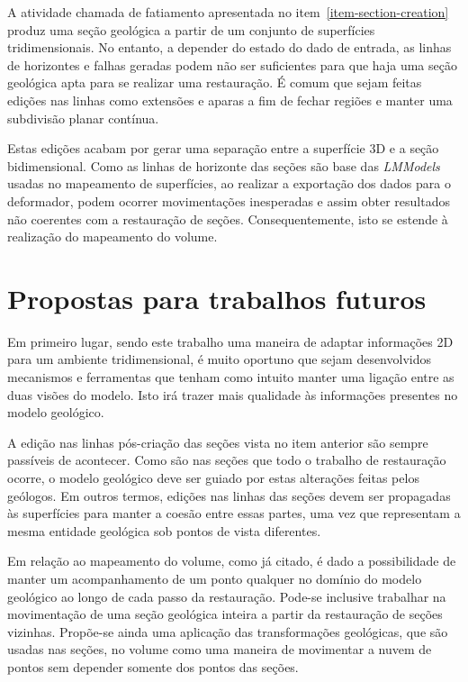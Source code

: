 A atividade chamada de fatiamento apresentada no item~\ref{item-section-creation} produz uma seção geológica a partir de um conjunto de superfícies tridimensionais. No entanto, a depender do estado do dado de entrada, as linhas de horizontes e falhas geradas podem não ser suficientes para que haja uma seção geológica apta para se realizar uma restauração. É comum que sejam feitas edições nas linhas como extensões e aparas a fim de fechar regiões e manter uma subdivisão planar contínua.

Estas edições acabam por gerar uma separação entre a superfície 3D e a seção bidimensional. Como as linhas de horizonte das seções são base das \emph{LMModels} usadas no mapeamento de superfícies, ao realizar a exportação dos dados para o deformador, podem ocorrer movimentações inesperadas e assim obter resultados não coerentes com a restauração de seções. Consequentemente, isto se estende à realização do mapeamento do volume.

\section{Propostas para trabalhos futuros}

Em primeiro lugar, sendo este trabalho uma maneira de adaptar informações 2D para um ambiente tridimensional, é muito oportuno que sejam desenvolvidos mecanismos e ferramentas que tenham como intuito manter uma ligação entre as duas visões do modelo. Isto irá trazer mais qualidade às informações presentes no modelo geológico.

A edição nas linhas pós-criação das seções vista no item anterior são sempre passíveis de acontecer. Como são nas seções que todo o trabalho de restauração ocorre, o modelo geológico deve ser guiado por estas alterações feitas pelos geólogos. Em outros termos, edições nas linhas das seções devem ser propagadas às superfícies para manter a coesão entre essas partes, uma vez que representam a mesma entidade geológica sob pontos de vista diferentes.

Em relação ao mapeamento do volume, como já citado, é dado a possibilidade de manter um acompanhamento de um ponto qualquer no domínio do modelo geológico ao longo de cada passo da restauração. Pode-se inclusive trabalhar na movimentação de uma seção geológica inteira a partir da restauração de seções vizinhas. Propõe-se ainda uma aplicação das transformações geológicas, que são usadas nas seções, no volume como uma maneira de movimentar a nuvem de pontos sem depender somente dos pontos das seções.